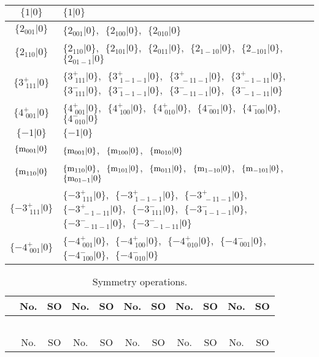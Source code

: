 \documentclass[fleqn,10pt,landscape]{article}
\begin{document}
\begin{itemize}
\begin{center}
\begin{longtable}{c|l}
$\{1|0\}$ & $\{1|0\}$ \\ \hline
$\{2{}_{001}|0\}$ & $\{2{}_{001}|0\}$,\,\, $\{2{}_{100}|0\}$,\,\, $\{2{}_{010}|0\}$ \\ \hline
$\{2{}_{110}|0\}$ & $\{2{}_{110}|0\}$,\,\, $\{2{}_{101}|0\}$,\,\, $\{2{}_{011}|0\}$,\,\, $\{2{}_{1-10}|0\}$,\,\, $\{2{}_{-101}|0\}$,\,\, $\{2{}_{01-1}|0\}$ \\ \hline
$\{3^{+}_{\,\,111}|0\}$ & $\{3^{+}_{\,\,111}|0\}$,\,\, $\{3^{+}_{\,\,1-1-1}|0\}$,\,\, $\{3^{+}_{\,\,-11-1}|0\}$,\,\, $\{3^{+}_{\,\,-1-11}|0\}$,\,\, $\{3^{-}_{\,\,111}|0\}$,\,\, $\{3^{-}_{\,\,1-1-1}|0\}$,\,\, $\{3^{-}_{\,\,-11-1}|0\}$,\,\, $\{3^{-}_{\,\,-1-11}|0\}$ \\ \hline
$\{4^{+}_{\,\,001}|0\}$ & $\{4^{+}_{\,\,001}|0\}$,\,\, $\{4^{+}_{\,\,100}|0\}$,\,\, $\{4^{+}_{\,\,010}|0\}$,\,\, $\{4^{-}_{\,\,001}|0\}$,\,\, $\{4^{-}_{\,\,100}|0\}$,\,\, $\{4^{-}_{\,\,010}|0\}$ \\ \hline
$\{-1|0\}$ & $\{-1|0\}$ \\ \hline
$\{{\rm m}_{001}|0\}$ & $\{{\rm m}_{001}|0\}$,\,\, $\{{\rm m}_{100}|0\}$,\,\, $\{{\rm m}_{010}|0\}$ \\ \hline
$\{{\rm m}_{110}|0\}$ & $\{{\rm m}_{110}|0\}$,\,\, $\{{\rm m}_{101}|0\}$,\,\, $\{{\rm m}_{011}|0\}$,\,\, $\{{\rm m}_{1-10}|0\}$,\,\, $\{{\rm m}_{-101}|0\}$,\,\, $\{{\rm m}_{01-1}|0\}$ \\ \hline
$\{-3^{+}_{\,\,111}|0\}$ & $\{-3^{+}_{\,\,111}|0\}$,\,\, $\{-3^{+}_{\,\,1-1-1}|0\}$,\,\, $\{-3^{+}_{\,\,-11-1}|0\}$,\,\, $\{-3^{+}_{\,\,-1-11}|0\}$,\,\, $\{-3^{-}_{\,\,111}|0\}$,\,\, $\{-3^{-}_{\,\,1-1-1}|0\}$,\,\, $\{-3^{-}_{\,\,-11-1}|0\}$,\,\, $\{-3^{-}_{\,\,-1-11}|0\}$ \\ \hline
$\{-4^{+}_{\,\,001}|0\}$ & $\{-4^{+}_{\,\,001}|0\}$,\,\, $\{-4^{+}_{\,\,100}|0\}$,\,\, $\{-4^{+}_{\,\,010}|0\}$,\,\, $\{-4^{-}_{\,\,001}|0\}$,\,\, $\{-4^{-}_{\,\,100}|0\}$,\,\, $\{-4^{-}_{\,\,010}|0\}$ \\
\end{longtable}
\end{center}
\begin{center}
\renewcommand{\arraystretch}{1.3}
\begin{longtable}{c|cc|cc|cc|cc|cc}
\caption{Symmetry operations.}
 \\
 \hline \hline
 & No. & SO & No. & SO & No. & SO & No. & SO & No. & SO \\ \hline \endfirsthead

\multicolumn{10}{l}{\tablename\ \thetable{}} \\
 \hline \hline
 & No. & SO & No. & SO & No. & SO & No. & SO & No. & SO \\ \hline \endhead


\end{longtable}
\end{center}
\end{itemize}
\end{document}
